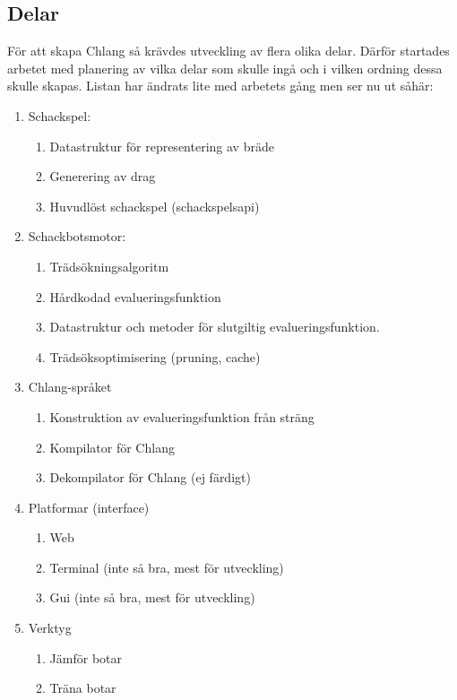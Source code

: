 \documentclass{article}
\begin{document}
	\subsection{Delar}	
	För att skapa Chlang så krävdes utveckling av flera olika delar. Därför startades arbetet med planering av vilka delar som skulle ingå och i vilken ordning dessa skulle skapas. Listan har ändrats lite med arbetets gång men ser nu ut såhär:
	\begin{enumerate}
	\item Schackspel:
		\begin{enumerate}
			\item Datastruktur för representering av bräde
			\item Generering av drag
			\item Huvudlöst schackspel (schackspelsapi)
		\end{enumerate}
	\item Schackbotsmotor:
	\begin{enumerate}
	\item Trädsökningsalgoritm
	\item Hårdkodad evalueringsfunktion
	\item Datastruktur och metoder för slutgiltig evalueringsfunktion.
	\item Trädsöksoptimisering (pruning, cache)
	\end{enumerate}
	\item Chlang-språket
	\begin{enumerate}
	\item Konstruktion av evalueringsfunktion från sträng
	\item Kompilator för Chlang
	\item Dekompilator för Chlang (ej färdigt)
	\end{enumerate}
	\item Platformar (interface)
	\begin{enumerate}
	\item Web
	\item Terminal (inte så bra, mest för utveckling)
	\item Gui (inte så bra, mest för utveckling)
	\end{enumerate}
	\item Verktyg
	\begin{enumerate}
	\item Jämför botar
	\item Träna botar
	\end{enumerate}
	\end{enumerate}
\end{document}
